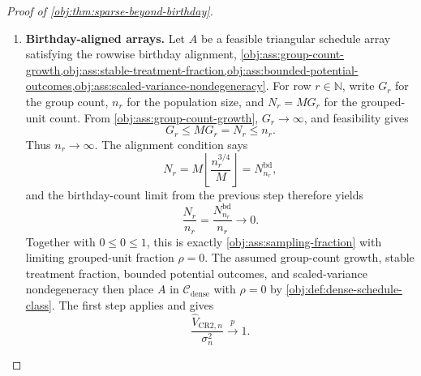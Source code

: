 \begin{proof}[Proof of \cref{obj:thm:sparse-beyond-birthday}]
\begin{enumerate}
\item \textbf{Birthday-aligned arrays.}
Let \(A\) be a feasible triangular schedule array satisfying the rowwise birthday alignment, \cref{obj:ass:group-count-growth,obj:ass:stable-treatment-fraction,obj:ass:bounded-potential-outcomes,obj:ass:scaled-variance-nondegeneracy}. For row \(r\in\mathbb N\), write \(G_r\) for the group count, \(n_r\) for the population size, and \(N_r=MG_r\) for the grouped-unit count. From \cref{obj:ass:group-count-growth}, \(G_r\to\infty\), and feasibility gives
\[
G_r\le M G_r=N_r\le n_r .
\]
Thus \(n_r\to\infty\). The alignment condition says
\[
N_r
=
M\left\lfloor \frac{n_r^{3/4}}{M}\right\rfloor
=
N_{n_r}^{\mathrm{bd}},
\]
and the birthday-count limit from the previous step therefore yields
\[
\frac{N_r}{n_r}
=
\frac{N_{n_r}^{\mathrm{bd}}}{n_r}
\to 0 .
\]
Together with \(0\le 0\le 1\), this is exactly \cref{obj:ass:sampling-fraction} with limiting grouped-unit fraction \(\rho=0\). The assumed group-count growth, stable treatment fraction, bounded potential outcomes, and scaled-variance nondegeneracy then place \(A\) in \(\mathcal C_{\mathrm{dense}}\) with \(\rho=0\) by \cref{obj:def:dense-schedule-class}. The first step applies and gives
\[
\frac{\widehat V_{\mathrm{CR2},n}}{\sigma_n^2}
\xrightarrow{p}1 .
\]
\end{enumerate}
\end{proof}

